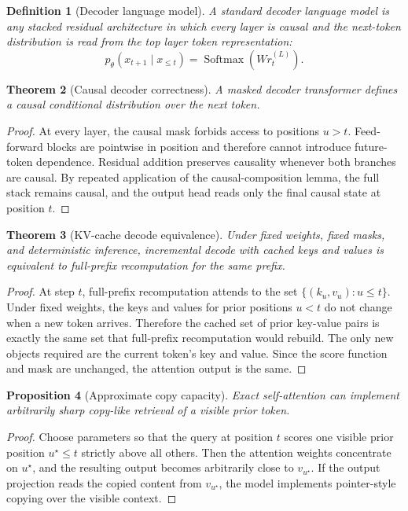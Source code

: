 \documentclass[11pt]{article}
\newtheorem{definition}{Definition}[section]
\newtheorem{theorem}[definition]{Theorem}
\newtheorem{proposition}[definition]{Proposition}
\newcommand{\Softmax}{\operatorname{Softmax}}
\begin{document}
\begin{definition}[Decoder language model]
A standard decoder language model is any stacked residual architecture in which
every layer is causal and the next-token distribution is read from the top
layer token representation:
\[
  p_\theta(x_{t+1}\mid x_{\le t}) = \Softmax(W r_t^{(L)}).
\]
\end{definition}

\begin{theorem}[Causal decoder correctness]
A masked decoder transformer defines a causal conditional distribution over the
next token.
\end{theorem}

\begin{proof}
At every layer, the causal mask forbids access to positions $u > t$.
Feed-forward blocks are pointwise in position and therefore cannot introduce
future-token dependence. Residual addition preserves causality whenever both
branches are causal. By repeated application of the causal-composition lemma,
the full stack remains causal, and the output head reads only the final causal
state at position $t$.
\end{proof}

\begin{theorem}[KV-cache decode equivalence]
Under fixed weights, fixed masks, and deterministic inference,
incremental decode with cached keys and values is equivalent to full-prefix
recomputation for the same prefix.
\end{theorem}

\begin{proof}
At step $t$, full-prefix recomputation attends to the set
$\{(k_u, v_u) : u \le t\}$. Under fixed weights, the keys and values for prior
positions $u < t$ do not change when a new token arrives. Therefore the cached
set of prior key-value pairs is exactly the same set that full-prefix
recomputation would rebuild. The only new objects required are the current
token's key and value. Since the score function and mask are unchanged, the
attention output is the same.
\end{proof}

\begin{proposition}[Approximate copy capacity]
Exact self-attention can implement arbitrarily sharp copy-like retrieval of a
visible prior token.
\end{proposition}

\begin{proof}
Choose parameters so that the query at position $t$ scores one visible prior
position $u^\star \le t$ strictly above all others. Then the attention weights
concentrate on $u^\star$, and the resulting output becomes arbitrarily close to
$v_{u^\star}$. If the output projection reads the copied content from
$v_{u^\star}$, the model implements pointer-style copying over the visible
context.
\end{proof}
\end{document}
